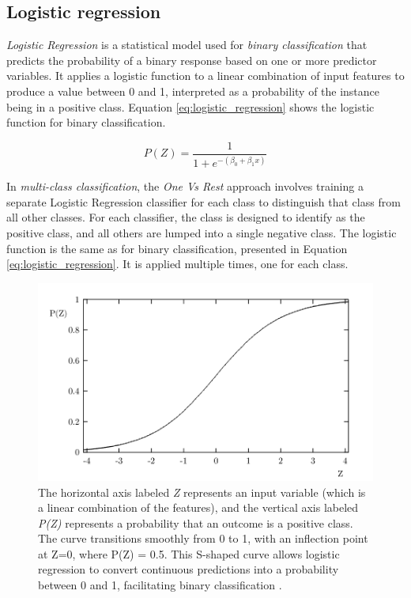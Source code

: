         \newpage

        \subsection{Logistic regression}
            \textit{Logistic Regression} is a statistical model used for \textit{binary classification} that predicts the probability of a binary response based on one or more predictor variables. It applies a logistic function to a linear combination of input features to produce a value between 0 and 1, interpreted as a probability of the instance being in a positive class.
            Equation \ref{eq:logistic_regression} shows the logistic function for binary classification.

            \begin{equation} \label{eq:logistic_regression}
                P(Z) = \frac{1}{1 + e^{-(\beta_0 + \beta_1 x)}}
            \end{equation}

            In \textit{multi-class classification}, the \textit{One Vs Rest} approach involves training a separate Logistic Regression classifier for each class to distinguish that class from all other classes. For each classifier, the class is designed to identify as the positive class, and all others are lumped into a single negative class.
            The logistic function is the same as for binary classification, presented in Equation \ref{eq:logistic_regression}. It is applied multiple times, one for each class.
            
            \begin{figure}[htbp]
                \centering
                \includegraphics[width=.8\textwidth]{../src/resources/images/models/logistic.png}
                \caption{
                    The horizontal axis labeled \textit{Z} represents an input variable (which is a linear combination of the features), and the vertical axis labeled \textit{P(Z)} represents a probability that an outcome is a positive class. The curve transitions smoothly from 0 to 1, with an inflection point at Z=0, where P(Z) = 0.5. This S-shaped curve allows logistic regression to convert continuous predictions into a probability between 0 and 1, facilitating binary classification \cite{cramer_origins_2002}.
                }
                \label{fig:logistic_regression}
            \end{figure}

